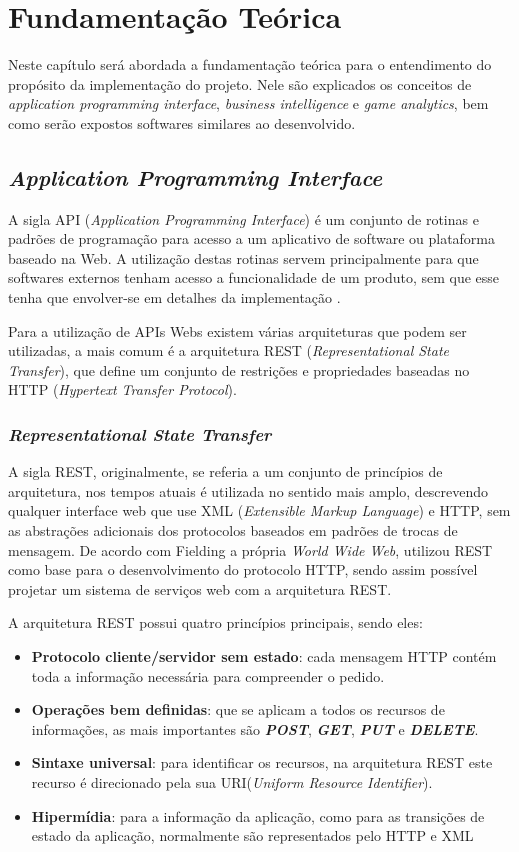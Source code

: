 \chapter[Fundamentação Teórica]{Fundamentação Teórica}
Neste capítulo será abordada a fundamentação teórica para o entendimento do propósito da implementação do projeto. Nele são explicados os conceitos de \textit{application programming interface}, \textit{business intelligence} e \textit{game analytics}, bem como serão expostos softwares similares ao desenvolvido.

\section{\textit{Application Programming Interface}}
A sigla API (\textit{Application Programming Interface}) é um conjunto de rotinas e padrões de programação para acesso a um aplicativo de software ou plataforma baseado na Web. A utilização destas rotinas servem principalmente para que softwares externos tenham acesso a funcionalidade de um produto, sem que esse tenha que envolver-se em detalhes da implementação \cite{api}.

Para a utilização de APIs Webs existem várias arquiteturas que podem ser utilizadas, a mais comum é a arquitetura REST (\textit{Representational State Transfer}), que define um conjunto de restrições e propriedades baseadas no HTTP (\textit{Hypertext Transfer Protocol}).
\subsection{\textit{Representational State Transfer}}
A sigla REST, originalmente, se referia a um conjunto de princípios de arquitetura, nos tempos atuais é utilizada no sentido mais amplo, descrevendo qualquer interface web que use XML (\textit{Extensible Markup Language}) e HTTP, sem as abstrações adicionais dos protocolos baseados em padrões de trocas de mensagem. De acordo com Fielding \cite{fielding} a própria \textit{World Wide Web}, utilizou REST como base para o desenvolvimento do protocolo HTTP, sendo assim possível projetar um sistema de serviços web com a arquitetura REST.

A arquitetura REST possui quatro princípios principais, sendo eles:
\begin{itemize}
	\item \textbf{Protocolo cliente/servidor sem estado}: cada mensagem HTTP contém toda a informação necessária para compreender o pedido.
	\item \textbf{Operações bem definidas}: que se aplicam a todos os recursos de informações, as mais importantes são \textit{\textbf{POST}}, \textit{\textbf{GET}}, \textit{\textbf{PUT}} e \textit{\textbf{DELETE}}.
	\item \textbf{Sintaxe universal}: para identificar os recursos, na arquitetura REST este recurso é direcionado pela sua URI(\textit{Uniform Resource Identifier}).
	\item \textbf{Hipermídia}: para a informação da aplicação, como para as transições de estado da aplicação, normalmente são representados pelo HTTP e XML
\end{itemize}

